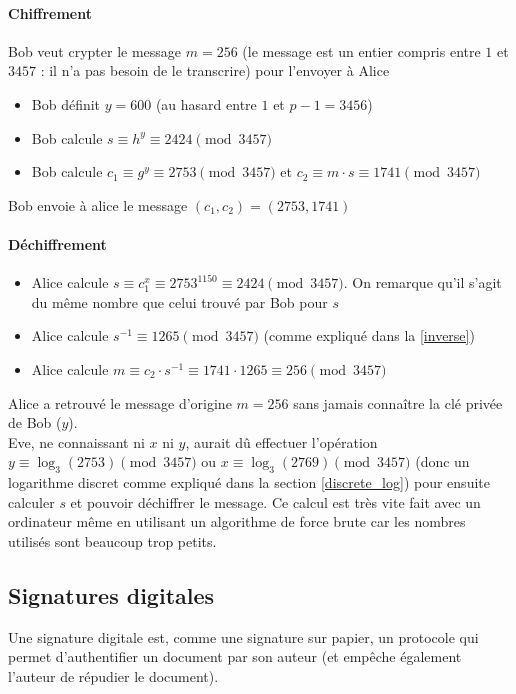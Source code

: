 \documentclass[10pt,a4paper,twoside]{article}
\numberwithin{equation}{section}
\begin{document}
			\paragraph{Chiffrement}
				Bob veut crypter le message $m = 256$ (le message est un entier compris entre $1$ et $3457$ : il n'a pas besoin de le transcrire) pour l'envoyer à Alice
				\begin{itemize}
					\item Bob définit $y = 600$ (au hasard entre $1$ et $p-1 = 3456$)
					\item Bob calcule $s \equiv h^y \equiv 2424 \pmod{3457}$
					\item Bob calcule $c_1 \equiv g^y \equiv 2753 \pmod{3457}$ et $c_2 \equiv m \cdot s \equiv 1741 \pmod{3457}$
				\end{itemize}
				Bob envoie à alice le message $(c_1,c_2) = (2753,1741)$
				
			\paragraph{Déchiffrement}
				\begin{itemize}
					\item Alice calcule $s \equiv c_1^x \equiv 2753^{1150} \equiv 2424 \pmod{3457}$. On remarque qu'il s'agit du même nombre que celui trouvé par Bob pour $s$
					\item Alice calcule $s^{-1} \equiv 1265 \pmod{3457}$ (comme expliqué dans la \autoref{inverse})
					\item Alice calcule $m \equiv c_2 \cdot s^{-1} \equiv 1741 \cdot 1265 \equiv 256 \pmod{3457}$
				\end{itemize}
				Alice a retrouvé le message d'origine $m=256$ sans jamais connaître la clé privée de Bob ($y$).\\
				
			Eve, ne connaissant ni $x$ ni $y$, aurait dû effectuer l'opération $y \equiv \log_3(2753) \pmod{3457}$ ou $x \equiv \log_3(2769) \pmod{3457}$ (donc un logarithme discret comme expliqué dans la section \autoref{discrete_log}) pour ensuite calculer $s$ et pouvoir déchiffrer le message. Ce calcul est très vite fait avec un ordinateur même en utilisant un algorithme de force brute car les nombres utilisés sont beaucoup trop petits.
		
	
	\subsection{Signatures digitales} \label{digital_signature}
		Une signature digitale est, comme une signature sur papier, un protocole qui permet d'authentifier un document par son auteur (et empêche également l'auteur de répudier le document). \cite{wiki:signatures_digitales}\\
		
\end{document}
